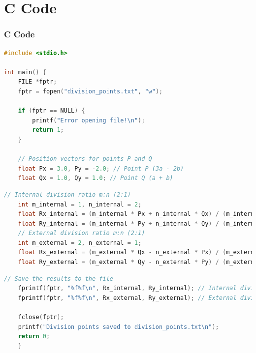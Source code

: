 \documentclass{beamer}
\theoremstyle{remark}
\numberwithin{equation}{section}
\begin{document}
	\section{C Code}
	\begin{frame}[fragile]
	\frametitle{C Code}
	\begin{lstlisting}[language=C]
#include <stdio.h>
			
int main() {
	FILE *fptr;
	fptr = fopen("division_points.txt", "w");
				
	if (fptr == NULL) {
		printf("Error opening file!\n");
		return 1;
	}
				
	// Position vectors for points P and Q
	float Px = 3.0, Py = -2.0; // Point P (3a - 2b)
	float Qx = 1.0, Qy = 1.0; // Point Q (a + b)
	\end{lstlisting}
	\end{frame}
	\begin{frame}[fragile]
	\begin{lstlisting}[language=C]
	// Internal division ratio m:n (2:1)
	int m_internal = 1, n_internal = 2;
	float Rx_internal = (m_internal * Px + n_internal * Qx) / (m_internal + n_internal);
	float Ry_internal = (m_internal * Py + n_internal * Qy) / (m_internal + n_internal);
	// External division ratio m:n (2:1)
	int m_external = 2, n_external = 1;
	float Rx_external = (m_external * Qx - n_external * Px) / (m_external - n_external);
	float Ry_external = (m_external * Qy - n_external * Py) / (m_external - n_external);
	\end{lstlisting}
	\end{frame}
	\begin{frame}[fragile]
	\begin{lstlisting}[language=C]
	// Save the results to the file
	fprintf(fptr, "%f%f\n", Rx_internal, Ry_internal); // Internal division
	fprintf(fptr, "%f%f\n", Rx_external, Ry_external); // External division
	
	fclose(fptr);
	printf("Division points saved to division_points.txt\n");
	return 0;
	}
	\end{lstlisting}
	\end{frame}
\end{document}
